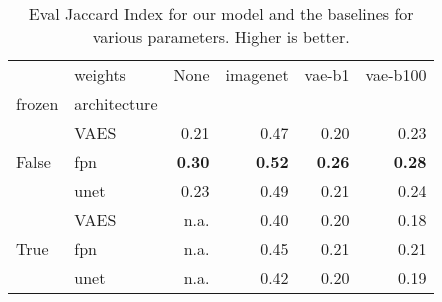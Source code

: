 \begin{table}[ht]
\caption{Eval Jaccard Index for our model and the baselines for various parameters. Higher is better.}
\label{tab:baseline_results}
\begin{tabular}{llrrrr}
\toprule
 & weights & None & imagenet & vae-b1 & vae-b100 \\
frozen & architecture &  &  &  &  \\
\midrule
\multirow[c]{3}{*}{False} & VAES & 0.21 & 0.47 & 0.20 & 0.23 \\
 & fpn & \textbf{0.30} & \textbf{0.52} & \textbf{0.26} & \textbf{0.28} \\
 & unet & 0.23 & 0.49 & 0.21 & 0.24 \\
\multirow[c]{3}{*}{True} & VAES & n.a. & 0.40 & 0.20 & 0.18 \\
 & fpn & n.a. & 0.45 & 0.21 & 0.21 \\
 & unet & n.a. & 0.42 & 0.20 & 0.19 \\
\bottomrule
\end{tabular}
\end{table}
